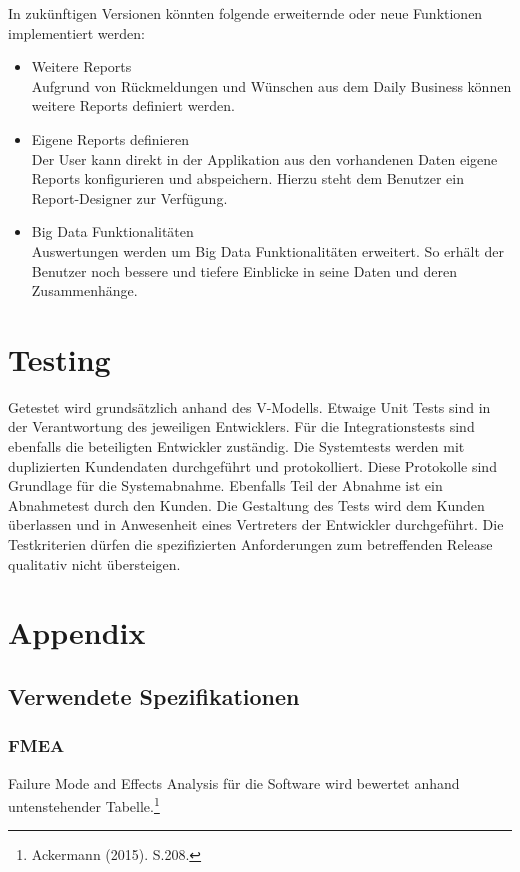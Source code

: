 \documentclass[a4paper]{scrreprt}
\begin{document}
In zukünftigen Versionen könnten folgende erweiternde oder neue Funktionen implementiert werden:
\begin{itemize}
\item Weitere Reports\\
Aufgrund von Rückmeldungen und Wünschen aus dem Daily Business können weitere Reports definiert werden.
\item Eigene Reports definieren\\
Der User kann direkt in der Applikation aus den vorhandenen Daten eigene Reports konfigurieren und abspeichern. Hierzu steht dem Benutzer ein Report-Designer zur Verfügung.
\item Big Data Funktionalitäten \\
Auswertungen werden um Big Data Funktionalitäten erweitert. So erhält der Benutzer noch bessere und tiefere Einblicke in seine Daten und deren Zusammenhänge.
\end{itemize}


\chapter{Testing}
Getestet wird grundsätzlich anhand des V-Modells. Etwaige Unit Tests sind in der Verantwortung des jeweiligen Entwicklers. Für die Integrationstests sind ebenfalls die beteiligten Entwickler zuständig.
Die Systemtests werden mit duplizierten Kundendaten durchgeführt und protokolliert. Diese Protokolle sind Grundlage für die Systemabnahme. Ebenfalls Teil der Abnahme ist ein Abnahmetest durch den Kunden. Die Gestaltung des Tests wird dem Kunden überlassen und in Anwesenheit eines Vertreters der Entwickler durchgeführt. Die Testkriterien dürfen die spezifizierten Anforderungen zum betreffenden Release qualitativ nicht übersteigen.


\chapter{Appendix}

\section{Verwendete Spezifikationen}
\subsection{FMEA}
Failure Mode and Effects Analysis für die Software wird bewertet anhand untenstehender Tabelle.\footnote{Ackermann (2015). S.208.}
\end{document}
